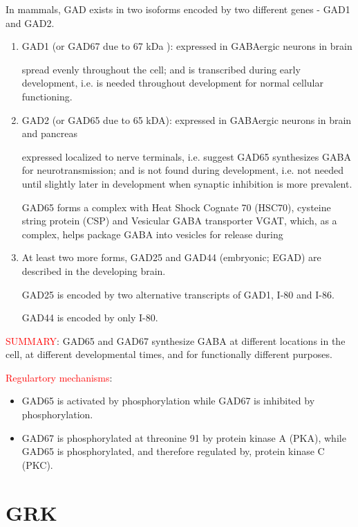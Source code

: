 In mammals, GAD exists in two isoforms encoded by two different genes - GAD1 and
GAD2. 
\begin{enumerate}

  \item  GAD1 (or GAD67 due to 67 kDa ): expressed in GABAergic neurons in brain
  
  spread evenly throughout the cell; and is transcribed during early
  development, i.e. is needed throughout development for normal cellular
  functioning.
  
  \item GAD2 (or GAD65 due to 65 kDA): expressed in GABAergic neurons in brain
  and pancreas
  
  expressed localized to nerve terminals, i.e. suggest GAD65 
  synthesizes GABA for neurotransmission; and is not found during
  development, i.e. not needed until slightly later in development when synaptic
  inhibition is more prevalent.
  
  GAD65 forms a complex with Heat Shock Cognate 70 (HSC70), cysteine string
  protein (CSP) and Vesicular GABA transporter VGAT, which, as a complex, helps
  package GABA into vesicles for release during
  
  \item At least two more forms, GAD25 and GAD44 (embryonic; EGAD) are described
  in the developing brain. 
  
GAD25 is encoded by two alternative transcripts of GAD1, I-80 and I-86.

GAD44 is encoded by only I-80.  
\end{enumerate}

\textcolor{red}{SUMMARY}: GAD65 and GAD67 synthesize GABA at different locations
in the cell, at different developmental times, and for functionally different purposes.

\textcolor{red}{Regulartory mechanisms}:
\begin{itemize}
  \item GAD65 is activated by phosphorylation while GAD67 is inhibited by
  phosphorylation.
  
  \item GAD67 is phosphorylated at threonine 91 by protein kinase A (PKA), while
  GAD65 is phosphorylated, and therefore regulated by, protein kinase C (PKC).
\end{itemize}

\section{GRK}
\label{sec:GRK}

